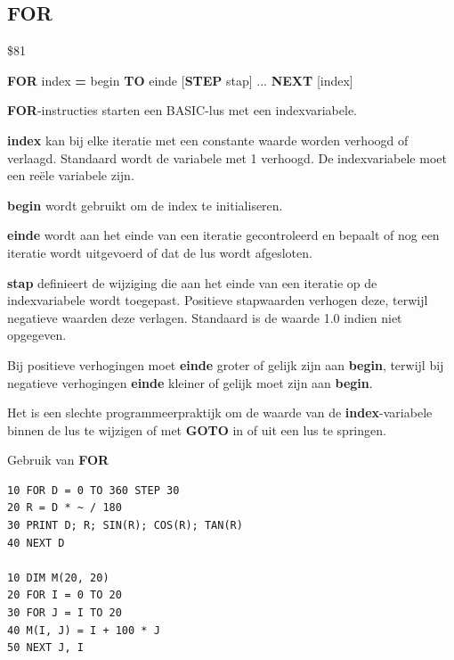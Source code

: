 \subsection{FOR}
\begin{description}[leftmargin=2cm,style=nextline]
\item [Token:]    \$81

\item [Formaat:]   {\bf FOR} index {\bf=} begin {\bf TO} einde	[{\bf STEP} stap] ... {\bf NEXT} [index]

\item [Gebruik:]    {\bf FOR}-instructies starten een BASIC-lus met een indexvariabele.

                  {\bf index} kan bij elke iteratie met een constante waarde worden verhoogd of verlaagd. Standaard wordt de variabele met 1 verhoogd. De indexvariabele moet een reële variabele zijn.

{\bf begin} wordt gebruikt om de index te initialiseren.

{\bf einde} wordt aan het einde van een iteratie gecontroleerd en bepaalt of nog een iteratie wordt uitgevoerd of dat de lus wordt afgesloten.

{\bf stap} definieert de wijziging die aan het einde van een iteratie op de indexvariabele wordt toegepast. Positieve stapwaarden verhogen deze, terwijl negatieve waarden deze verlagen. Standaard is de waarde 1.0 indien niet opgegeven.

\item [Opmerkingen:]  Bij positieve verhogingen moet {\bf einde} groter of gelijk zijn aan {\bf begin}, terwijl bij negatieve verhogingen {\bf einde} kleiner of gelijk moet zijn aan {\bf begin}.

                  Het is een slechte programmeerpraktijk om de waarde van de {\bf index}-variabele binnen de lus te wijzigen of met {\bf GOTO} in of uit een lus te springen.

\item [Voorbeelden:] Gebruik van {\bf FOR}

\begin{tcolorbox}[colback=black,coltext=white]
\verbatimfont{\codefont}
\begin{verbatim}
10 FOR D = 0 TO 360 STEP 30
20 R = D * ~ / 180
30 PRINT D; R; SIN(R); COS(R); TAN(R)
40 NEXT D

10 DIM M(20, 20)
20 FOR I = 0 TO 20
30 FOR J = I TO 20
40 M(I, J) = I + 100 * J
50 NEXT J, I
\end{verbatim}
\end{tcolorbox}
\end{description}

